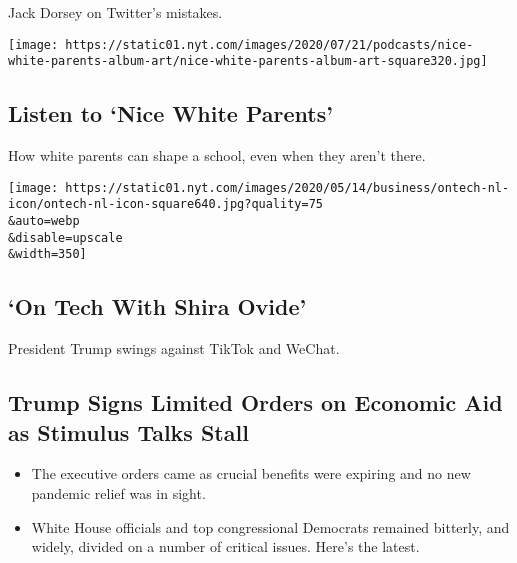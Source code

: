 Jack Dorsey on Twitter's mistakes.

\href{/2020/08/06/podcasts/episode-three-this-is-our-school-how-dare-you.html}{}

\texttt{[image: https://static01.nyt.com/images/2020/07/21/podcasts/nice-white-parents-album-art/nice-white-parents-album-art-square320.jpg]}

\href{/2020/08/06/podcasts/episode-three-this-is-our-school-how-dare-you.html}{}

\hypertarget{listen-to-nice-white-parents}{%
\subsection{Listen to `Nice White
Parents'}\label{listen-to-nice-white-parents}}

How white parents can shape a school, even when they aren't there.

\href{/2020/08/07/technology/trump-tiktok-wechat.html}{}

\texttt{[image: https://static01.nyt.com/images/2020/05/14/business/ontech-nl-icon/ontech-nl-icon-square640.jpg?quality=75\\\&auto=webp\\\&disable=upscale\\\&width=350]}

\href{/2020/08/07/technology/trump-tiktok-wechat.html}{}

\hypertarget{on-tech-with-shira-ovide}{%
\subsection{`On Tech With Shira Ovide'}\label{on-tech-with-shira-ovide}}

President Trump swings against TikTok and WeChat.

\href{/2020/08/08/world/coronavirus-updates.html}{}

\hypertarget{trump-signs-limited-orders-on-economic-aid-as-stimulus-talks-stall}{%
\subsection{Trump Signs Limited Orders on Economic Aid as Stimulus Talks
Stall}\label{trump-signs-limited-orders-on-economic-aid-as-stimulus-talks-stall}}

\begin{itemize}
\tightlist
\item
  The executive orders came as crucial benefits were expiring and no new
  pandemic relief was in sight.
\item
  White House officials and top congressional Democrats remained
  bitterly, and widely, divided on a number of critical issues. Here's
  the latest.
\end{itemize}

